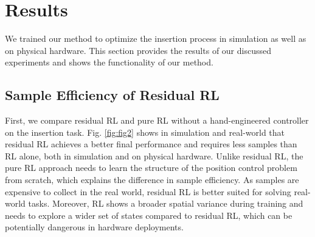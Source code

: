 \section{Results}\label{sec:results}

We trained our method to optimize the insertion process in simulation as well as on physical hardware.
This section provides the results of our discussed experiments and shows the functionality of our method.

\subsection{Sample Efficiency of Residual RL}

First, we compare residual RL and pure RL without a hand-engineered controller on the insertion task. 
Fig. \ref{fig:fig2} shows in simulation and real-world that residual RL achieves a better final performance and requires less samples than RL alone, both in simulation and on physical hardware. 
Unlike residual RL, the pure RL approach needs to learn the structure of the position control problem from scratch, which explains the difference in sample efficiency.
As samples are expensive to collect in the real world, residual RL is better suited for solving real-world tasks. Moreover, RL shows a broader spatial variance during training and needs to explore a wider set of states compared to residual RL, which can be potentially dangerous in hardware deployments.

